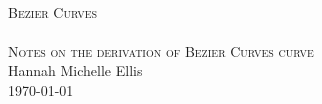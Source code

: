 \begin{titlepage}
\begin{center}
\HRule \\[0.5cm]
\textsc{\huge Bezier Curves}\\[0.5cm]
\HRule \\[0.5cm]
\textsc{\Large Notes on the derivation of Bezier Curves curve}\\[0.5cm]
\vfill
Hannah Michelle Ellis\\[1.0cm]
\today
\end{center}
\end{titlepage}
